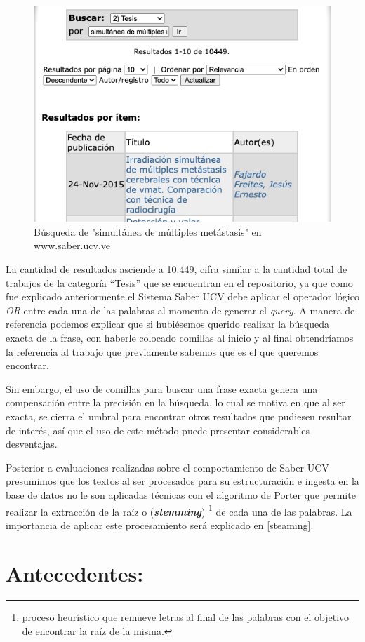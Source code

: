 \documentclass[
  10,
  spanish,
  openany]{book}
\begin{document}
\begin{figure}

{\centering \includegraphics[width=0.6\linewidth]{images/01-intro/texto_saber} 

}

\caption{Búsqueda de "simultánea de múltiples metástasis" en www.saber.ucv.ve}\label{fig:busquedasaber2}
\end{figure}

La cantidad de resultados asciende a 10.449, cifra similar a la cantidad total de trabajos de la categoría ``Tesis'' que se encuentran en el repositorio, ya que como fue explicado anteriormente el Sistema Saber UCV debe aplicar el operador lógico \emph{OR} entre cada una de las palabras al momento de generar el \emph{query}. A manera de referencia podemos explicar que si hubiésemos querido realizar la búsqueda exacta de la frase, con haberle colocado comillas al inicio y al final obtendríamos la referencia al trabajo que previamente sabemos que es el que queremos encontrar.

Sin embargo, el uso de comillas para buscar una frase exacta genera una compensación entre la precisión en la búsqueda, lo cual se motiva en que al ser exacta, se cierra el umbral para encontrar otros resultados que pudiesen resultar de interés, así que el uso de este método puede presentar considerables desventajas.

Posterior a evaluaciones realizadas sobre el comportamiento de Saber UCV presumimos que los textos al ser procesados para su estructuración e ingesta en la base de datos no le son aplicadas técnicas con el algoritmo de Porter que permite realizar la extracción de la raíz o (\textbf{\emph{stemming}}) \footnote{proceso heurístico que remueve letras al final de las palabras con el objetivo de encontrar la raíz de la misma.} de cada una de las palabras. La importancia de aplicar este procesamiento será explicado en \ref{steaming}.

\hypertarget{antecedentes}{%
\section{Antecedentes:}\label{antecedentes}}
\end{document}
